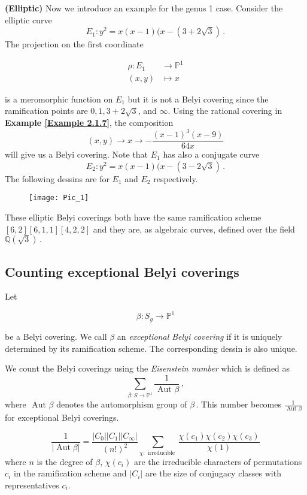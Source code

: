 \begin{example}{\bf(Elliptic)}\label{Example 2.1.8} Now we introduce an example for the genus 1 case.
Consider the elliptic curve $$E_{1}: y^{2}=x(x-1)(x-(3+2 \sqrt{3})\,.$$ The projection on the first coordinate

\begin{align*}
\rho: E_{1} & \rightarrow \mathbb{P}^{1} \\
(x, y) & \mapsto x
\end{align*}

is a meromorphic function on $E_1$ but it is not a Belyi covering since the ramification points are $0,1,3+2 \sqrt{3}$, and $\infty$. Using the rational covering in {\bf Example \ref{Example 2.1.7}}, the composition 
$$
(x, y) \rightarrow x \rightarrow-\frac{(x-1)^{3}(x-9)}{64 x}
$$
will give us a Belyi covering. Note that $E_{1}$ has also a conjugate curve $$E_{2}: y^{2}=x(x-1)(x-(3-2 \sqrt{3})\,.$$ 
The following dessins are for $E_1$ and $E_2$ respectively.

\begin{figure}[htp]
\texttt{[image: Pic\_1]}
\end{figure}


These elliptic Belyi coverings both have the same ramification scheme $[6,2][6,1,1][4,2,2]$ and they are, as algebraic curves, defined over the field $\mathbb{Q}(\sqrt{3})\,.$ 
\end{example}

\subsection{Counting exceptional Belyi coverings}
\begin{dfn}
    Let

$$
\beta: S_{g} \rightarrow \mathbb{P}^{1}
$$

be a Belyi covering. We call $\beta$ an \textit{exceptional Belyi covering} if it is uniquely determined by its ramification scheme. The corresponding dessin is also unique. 
\end{dfn}


We count the Belyi coverings using the \textit{Eisenstein number} which is defined as  $$\displaystyle\sum_{\beta: S \rightarrow \mathbb{P}^{1}} \frac{1}{\text { Aut } \beta}\,,$$ where $\text { Aut } \beta$ denotes the automorphism group of $\beta\,.$ This number becomes $\frac{1}{\text { Aut } \beta}$ for exceptional Belyi coverings.

\begin{thm}
\begin{equation*}
\frac{1}{|\operatorname{Aut} \beta|}=\frac{\left|C_{0}\right|\left|C_{1}\right|\left|C_{\infty}\right|}{(n !)^{2}} \sum_{\chi: \text { irreducible }} \frac{\chi\left(c_{1}\right) \chi\left(c_{2}\right) \chi\left(c_{3}\right)}{\chi(1)} 
\end{equation*}
where $n$ is the degree of $\beta$, $\chi\left(c_{i}\right)$ are the irreducible characters of permutations $c_{i}$ in the ramification scheme and $\left|C_{i}\right|$ are the size of conjugacy classes with representatives $c_{i}$. 
\end{thm}

